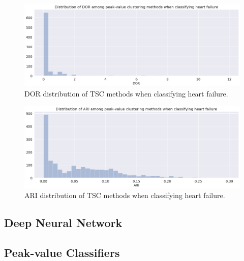 \begin{figure}[h!]
    \begin{center}
    \includegraphics[width=\textwidth]{results/tsc-hf-dor.png}
    \end{center}
    \caption{DOR distribution of TSC methods when classifying heart failure.}
    \label{fig:}
\end{figure}

\begin{figure}[h!]
    \begin{center}
    \includegraphics[width=\textwidth]{results/tsc-hf-ari.png}
    \end{center}
    \caption{ARI distribution of TSC methods when classifying heart failure.}
    \label{fig:}
\end{figure}

\subsection{Deep Neural Network}


\subsection{Peak-value Classifiers}

